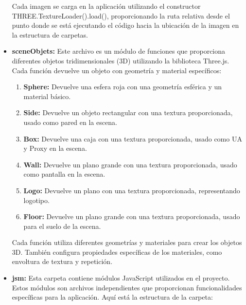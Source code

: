 \documentclass[a4paper, 12pt]{book}
\begin{document}
\begin{itemize}
  Cada imagen se carga en la aplicación utilizando el constructor THREE.TextureLoader().load(), 
  proporcionando la ruta relativa desde el punto donde se está ejecutando el código hacia la ubicación de la imagen en la estructura de carpetas.

  \item \textbf{sceneObjets:} Este archivo es un módulo de funciones que proporciona diferentes objetos tridimensionales (3D) utilizando la biblioteca Three.js. 
  Cada función devuelve un objeto con geometría y material específicos:

  \begin{enumerate}
    \item \textbf{Sphere:} Devuelve una esfera roja con una geometría esférica y un material básico.
    \item \textbf{Side:} Devuelve un objeto rectangular con una textura proporcionada, usado como pared en la escena.
    \item \textbf{Box:} Devuelve una caja con una textura proporcionada, usado como UA y Proxy en la escena.
    \item \textbf{Wall:} Devuelve un plano grande con una textura proporcionada, usado como pantalla en la escena.
    \item \textbf{Logo:} Devuelve un plano con una textura proporcionada, representando logotipo.
    \item \textbf{Floor:} Devuelve un plano grande con una textura proporcionada, usado para el suelo de la escena.
  \end{enumerate}

  Cada función utiliza diferentes geometrías y materiales para crear los objetos 3D. 
  También configura propiedades específicas de los materiales, como envoltura de textura y repetición.
  
  \item \textbf{jsm:} Esta carpeta contiene módulos JavaScript utilizados en el proyecto. Estos módulos son archivos independientes que proporcionan funcionalidades específicas para la aplicación. 
  Aquí está la estructura de la carpeta:


\end{itemize}
\end{document}
